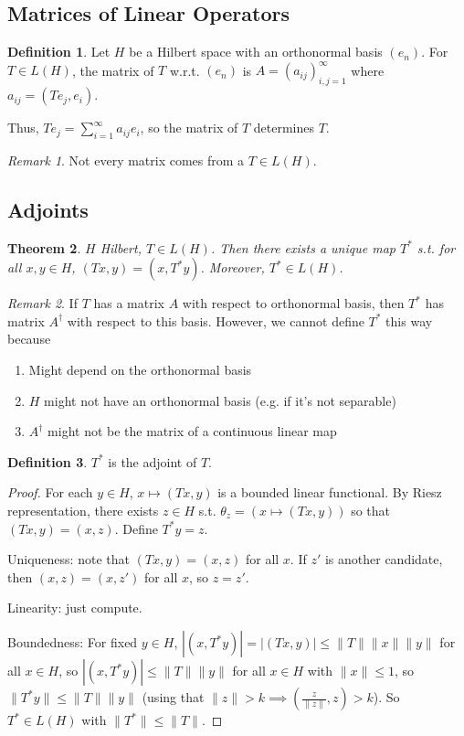 \documentclass{article}
\theoremstyle{definition}
\newtheorem{defn}{Definition}[section]
\theoremstyle{remark}
\newtheorem{rem}{Remark}
\theoremstyle{plain}
\newtheorem{thm}[defn]{Theorem}
\begin{document}
\subsection{Matrices of Linear Operators}
\begin{defn}
    Let $H$ be a Hilbert space with an orthonormal basis $(e_n)$. For $T\in L(H)$, the matrix of $T$ w.r.t. $(e_n)$ is $A=(a_{ij})_{i,j=1}^\infty$ where $a_{ij}=(Te_j,e_i)$.
\end{defn}
Thus, $Te_j=\sum_{i=1}^\infty a_{ij}e_i$, so the matrix of $T$ determines $T$.
\begin{rem}
    Not every matrix comes from a $T\in L(H)$.
\end{rem}
\subsection{Adjoints}
\begin{thm}
    $H$ Hilbert, $T\in L(H)$. Then there exists a unique map $T^\ast$ s.t. for all $x,y\in H$, $(Tx,y)=(x,T^\ast y)$. Moreover, $T^\ast\in L(H)$.
\end{thm}
\begin{rem}
    If $T$ has a matrix $A$ with respect to orthonormal basis, then $T^\ast$ has matrix $A^\dagger$ with respect to this basis. However, we cannot define $T^\ast$ this way because
    \begin{enumerate}[1)]
        \item Might depend on the orthonormal basis
        \item $H$ might not have an orthonormal basis (e.g. if it's not separable)
        \item $A^\dagger$ might not be the matrix of a continuous linear map
    \end{enumerate}
\end{rem}
\begin{defn}
    $T^\ast$ is the adjoint of $T$.
\end{defn}
\begin{proof}
    For each $y\in H$, $x\mapsto (Tx,y)$ is a bounded linear functional. By Riesz representation, there exists $z\in H$ s.t. $\theta_z=(x\mapsto (Tx,y))$ so that $(Tx,y)=(x,z)$. Define $T^\ast y=z$.

    Uniqueness: note that $(Tx,y)=(x,z)$ for all $x$. If $z'$ is another candidate, then $(x,z)=(x,z')$ for all $x$, so $z=z'$.

    Linearity: just compute.

    Boundedness: For fixed $y\in H$, $|(x,T^\ast y)|=|(Tx,y)|\le \|T\|\|x\|\|y\|$ for all $x\in H$, so $|(x,T^\ast y)|\le \|T\|\|y\|$ for all $x\in H$ with $\|x\|\le 1$, so $\|T^\ast y\|\le \|T\|\|y\|$ (using that $\|z\|>k\implies(\frac{z}{\|z\|},z)>k$). So $T^\ast \in L(H)$ with $\|T^\ast \|\le \|T\|$.
\end{proof}
\end{document}
